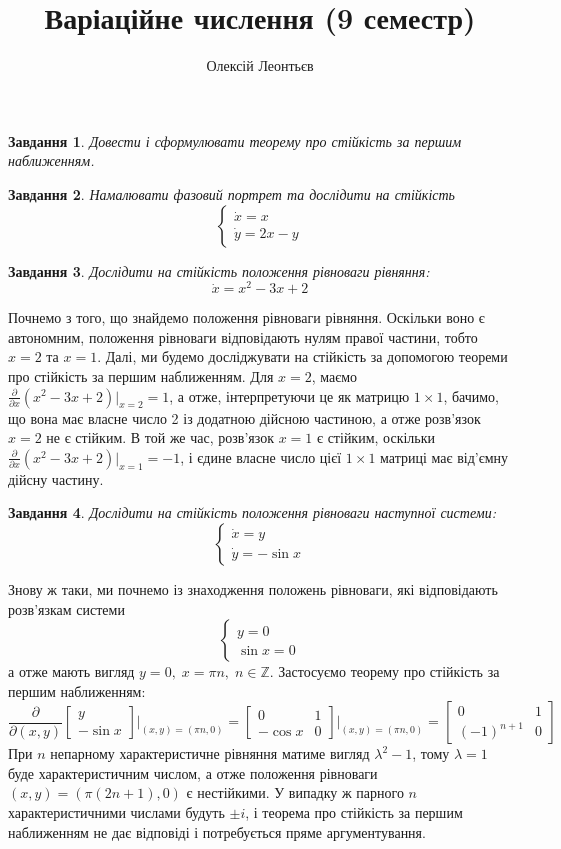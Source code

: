 \documentclass[12pt]{article} %
\title{Варіаційне числення (9 семестр)}
\author{Олексій Леонтьєв}
\newtheorem{prob}{Завдання}
\begin{document}
\maketitle
\begin{prob}Довести і сформулювати теорему про стійкість за першим наближенням.\end{prob}%
\begin{prob}Намалювати фазовий портрет та дослідити на стійкість%
	\[\begin{cases}\dot{x}=x\\\dot{y}=2x-y\end{cases}\]\end{prob}
\begin{prob}Дослідити на стійкість положення рівноваги рівняння:\[\dot{x}=x^2-3x+2\]\end{prob}
Почнемо з того, що знайдемо положення рівноваги рівняння. Оскільки воно є автономним, положення рівноваги відповідають
нулям правої частини, тобто $x=2$ та $x=1$. Далі, ми будемо досліджувати на стійкість за допомогою теореми про стійкість за першим
наближенням. Для $x=2$, маємо $\frac{\partial}{\partial x}(x^2-3x+2)\bigg|_{x=2}=1$, а отже, інтерпретуючи це як матрицю
$1\times1$, бачимо, що вона має власне число 2 із додатною дійсною частиною, а отже розв’язок $x=2$ не є стійким. В той же час, 
розв’язок $x=1$ є стійким, оскільки $\frac{\partial}{\partial x}(x^2-3x+2)\bigg|_{x=1}=-1$, і єдине власне число цієї $1\times1$ 
матриці має від’ємну дійсну частину.
\begin{prob}Дослідити на стійкість положення рівноваги наступної системи:
	\[\begin{cases}\dot{x}=y\\\dot{y}=-\sin x\end{cases}\]\end{prob}
	Знову ж таки, ми почнемо із знаходження положень рівноваги,
	які відповідають розв’язкам системи \[\begin{cases}y=0\\\sin x=0\end{cases}\]
	а отже мають вигляд $y=0,\;x=\pi n,\;n\in\mathbb{Z}$. Застосуємо теорему про стійкість за першим наближенням:
	\[\frac{\partial}{\partial (x,y)} \begin{bmatrix}y\\-\sin x\end{bmatrix}\bigg|_{(x,y)=(\pi n,0)}
		=\begin{bmatrix}0&1\\-\cos x&0\end{bmatrix}\bigg|_{(x,y)=(\pi n,0)}=\begin{bmatrix}0&1\\(-1)^{n+1}&0\end{bmatrix}\]
	При $n$ непарному характеристичне рівняння матиме вигляд $\lambda^2-1$, тому $\lambda=1$ буде характеристичним числом,
	а отже положення рівноваги $(x,y)=(\pi(2n+1),0)$ є нестійкими. У випадку ж парного $n$ характеристичними числами будуть
	$\pm i$, і теорема про стійкість за першим наближенням не дає відповіді і потребується пряме аргументування.\\
\end{document}
